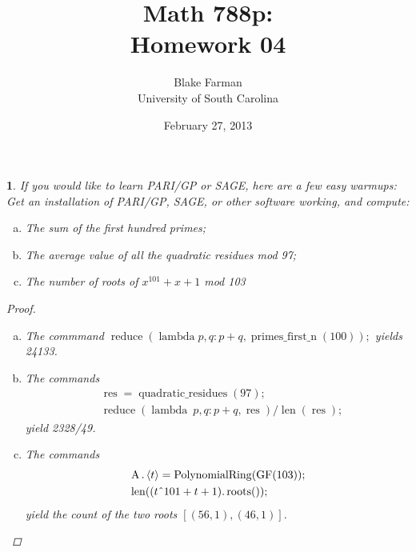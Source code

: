 \documentclass[10pt]{amsart}
\author{Blake Farman\\University of South Carolina}
\title{Math 788p:\\Homework 04}
\date{February 27, 2013}
\begin{document}
\maketitle

\providecommand{\p}{\mathfrak{p}}
\providecommand{\m}{\mathfrak{m}}

\theoremstyle{plain}
\newtheorem{thm}{}
\newtheorem{lem}{Lemma}
\theoremstyle{definition}
\newtheorem{defn}{Definition}

\setcounter{thm}{3}

\begin{thm}
  If you would like to learn PARI/GP or SAGE, here are a few easy warmups:
  Get an installation of PARI/GP, SAGE, or other software working, and compute:
  \begin{enumerate}[(a)]
  \item
    The sum of the first hundred primes;
  \item
    The average value of all the quadratic residues mod 97;
  \item
    The number of roots of $x^{101} + x + 1$ mod 103
  \end{enumerate}
  
  \begin{proof}
    \begin{enumerate}[(a)]
    \item
      The commmand $\operatorname{reduce}(\operatorname{lambda} p,q: p + q, \operatorname{primes\_first\_n}(100));$ yields 24133.
    \item
      The commands
      \begin{align*}
        &\operatorname{res} = \operatorname{quadratic\_residues}(97);\\
        &\operatorname{reduce}(\operatorname{lambda}\ p,q: p + q, \operatorname{res})/\operatorname{len}(\operatorname{res});
      \end{align*}
      yield 2328/49.
    \item
      The commands
      \begin{align*}
        &\operatorname{A}.\left<t\right> = \operatorname{PolynomialRing}(\operatorname{GF}(103));\\
        &\operatorname{len}((t\text{\^{ }} 101 + t + 1).\operatorname{roots}());
      \end{align*}
      yield the count of the two roots $\left[\left(56, 1\right), \left(46, 1\right)\right]$.
    \end{enumerate}
  \end{proof}
\end{thm}
\end{document}
